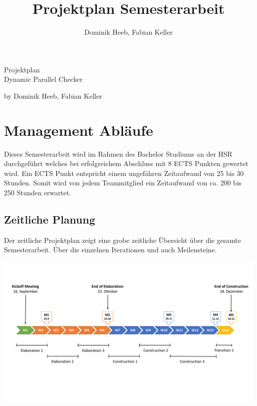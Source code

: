 \documentclass[10pt,a4paper]{article}
\author{Dominik Heeb, Fabian Keller}
\title{Projektplan Semesterarbeit}
\begin{document}
\begin{titlepage}
	\begin{Huge}
		\begin{center}
				Projektplan \\Dynamic Parallel Checker\\[2.0cm]
		\end{center}
	\end{Huge}
	
	\begin{Large}
		\begin{center}
				by Dominik Heeb, Fabian Keller		
		\end{center}
	\end{Large}
\end{titlepage}

\newpage
\tableofcontents 
\newpage

\section{Management Abläufe}
\begin{flushleft}
	Dieses Semesterarbeit wird im Rahmen des Bachelor Studiums an der HSR durchgeführt welches bei erfolgreichem Abschluss mit 8 ECTS Punkten gewertet wird. Ein ECTS Punkt entspricht einem ungefähren Zeitaufwand von 25 bis 30 Stunden. Somit wird von jedem Teammitglied ein Zeitaufwand von ca. 200 bis 250 Stunden erwartet.
\end{flushleft}

\subsection{Zeitliche Planung}
	\begin{flushleft}
		Der zeitliche Projektplan zeigt eine grobe zeitliche Übersicht über die gesamte Semesterarbeit. Über die einzelnen Iterationen und auch Meilensteine.
	\end{flushleft}
	\includegraphics[width=16cm,height=7.5cm,trim=10mm 40mm 0mm 20mm, clip]{pictures/Meilensteinplan.pdf}
\end{document}
